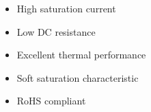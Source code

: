 \documentclass[10pt,a4paper]{article}
\begin{document}
\begin{minipage}[t]{0.45\textwidth}
\vspace{4mm}

\noindent{\large\bfseries\textcolor{headerblue}{Features}}
\vspace{2mm}

{\footnotesize
\begin{itemize}
    \setlength{\itemsep}{0pt}
    \item High saturation current
    \item Low DC resistance
    \item Excellent thermal performance
    \item Soft saturation characteristic
    \item RoHS compliant
\end{itemize}
}

\end{minipage}

\vspace{8mm}

\noindent{\large\bfseries\textcolor{headerblue}{Characteristic Curves}}
\vspace{3mm}

\begin{center}
\begin{minipage}{0.3\textwidth}
\centering
{}
\end{minipage}
\hfill
\begin{minipage}{0.3\textwidth}
\centering
{}
\end{minipage}
\hfill
\begin{minipage}{0.3\textwidth}
\centering
{}
\end{minipage}
\end{center}
\end{document}
